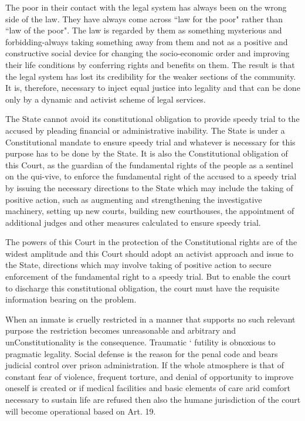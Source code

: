 \begin{multicols}{2}
\noi
The poor in their contact with the legal system has always been on the wrong side of the law. They have always come across “law for the poor" rather than “law of the poor". The law is regarded by them as something mysterious and forbidding-always taking something away from them and not as a positive and constructive social device for changing the socio-economic order and improving their life conditions by conferring rights and benefits on them. The result is that the legal system has lost its credibility for the weaker sections of the community. It is, therefore, necessary to inject equal justice into legality and that can be done only by a dynamic and activist scheme of legal services.

\noi
The State cannot avoid its constitutional obligation to provide speedy trial to the accused by pleading financial or administrative inability. The State is under a Constitutional mandate to ensure speedy trial and whatever is necessary for this purpose has to be done by the State. It is also the Constitutional obligation of this Court, as the guardian of the fundamental rights of the people as a sentinel on the qui-vive, to enforce the fundamental right of the accused to a speedy trial by issuing the necessary directions to the State which may include the taking of positive action, such as augmenting and strengthening the investigative machinery, setting up new courts, building new courthouses, the appointment of additional judges and other measures calculated to ensure speedy trial.

\noi
The powers of this Court in the protection of the Constitutional rights are of the widest amplitude and this Court should adopt an activist approach and issue to the State, directions which may involve taking of positive action to secure enforcement of the fundamental right to a speedy trial. But to enable the court to discharge this constitutional obligation, the court must have the requisite information bearing on the problem.

\noi
When an inmate is cruelly restricted in a manner that supports no such relevant purpose the restriction becomes unreasonable and arbitrary and unConstitutionality is the consequence. Traumatic ` futility is obnoxious to pragmatic legality. Social defense is the reason for the penal code and bears judicial control over prison administration. If the whole atmosphere is that of constant fear of violence, frequent torture, and denial of opportunity to improve oneself is created or if medical facilities and basic elements of care arid comfort necessary to sustain life are refused then also the humane jurisdiction of the court will become operational based on Art. 19.


\end{multicols}
